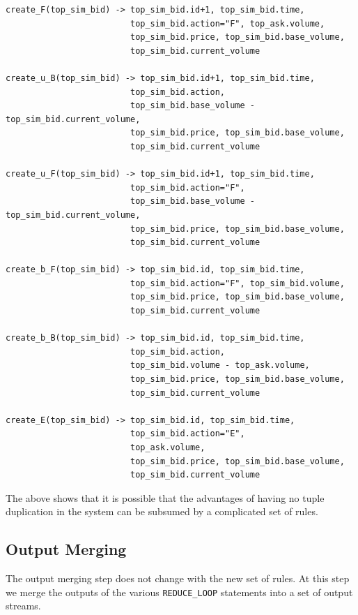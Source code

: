 \documentclass{article}
\begin{document}
\begin{verbatim}
create_F(top_sim_bid) -> top_sim_bid.id+1, top_sim_bid.time,
                         top_sim_bid.action="F", top_ask.volume,
                         top_sim_bid.price, top_sim_bid.base_volume, 
                         top_sim_bid.current_volume

create_u_B(top_sim_bid) -> top_sim_bid.id+1, top_sim_bid.time,
                         top_sim_bid.action, 
                         top_sim_bid.base_volume - top_sim_bid.current_volume,
                         top_sim_bid.price, top_sim_bid.base_volume, 
                         top_sim_bid.current_volume

create_u_F(top_sim_bid) -> top_sim_bid.id+1, top_sim_bid.time,
                         top_sim_bid.action="F", 
                         top_sim_bid.base_volume - top_sim_bid.current_volume,
                         top_sim_bid.price, top_sim_bid.base_volume, 
                         top_sim_bid.current_volume

create_b_F(top_sim_bid) -> top_sim_bid.id, top_sim_bid.time,
                         top_sim_bid.action="F", top_sim_bid.volume,
                         top_sim_bid.price, top_sim_bid.base_volume, 
                         top_sim_bid.current_volume

create_b_B(top_sim_bid) -> top_sim_bid.id, top_sim_bid.time,
                         top_sim_bid.action, 
                         top_sim_bid.volume - top_ask.volume, 
                         top_sim_bid.price, top_sim_bid.base_volume, 
                         top_sim_bid.current_volume
                     
create_E(top_sim_bid) -> top_sim_bid.id, top_sim_bid.time,
                         top_sim_bid.action="E", 
                         top_ask.volume,
                         top_sim_bid.price, top_sim_bid.base_volume, 
                         top_sim_bid.current_volume
\end{verbatim}

\noindent The above shows that it is possible that the advantages of having no tuple duplication in the system can be subsumed by a complicated set of rules.

\subsection{Output Merging}

The output merging step does not change with the new set of rules. At this step we merge the outputs of the various {\tt REDUCE\_LOOP} statements into a set of output streams.
\end{document}
